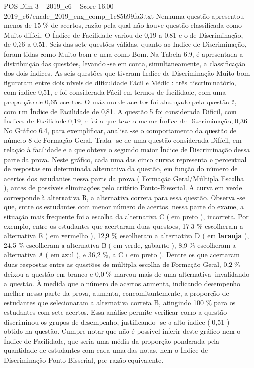 \begin{textsample}{POS Dim 3 – 2019\_c6 – Score 16.00 – 2019\_c6/enade\_2019\_eng\_comp\_1c85b99fa3.txt}
Nenhuma questão apresentou menos de 15 \% de acertos, razão pela qual não houve questão classificada como Muito difícil.
O Índice de Facilidade variou de 0,19 a 0,81 e o de Discriminação, de 0,36 a 0,51.
Seis das sete questões válidas, quanto ao Índice de Discriminação, foram tidas como Muito bom e uma como Bom.
Na Tabela 6.9, é apresentada a distribuição das questões, levando -se em conta, simultaneamente, a classificação dos dois índices.
As seis questões que tiveram Índice de Discriminação Muito bom figuraram entre dois níveis de dificuldade Fácil e Médio : três discriminatório, com índice 0,51, e foi considerada Fácil em termos de facilidade, com uma proporção de 0,65 acertos.
O máximo de acertos foi alcançado pela questão 2, com um Índice de Facilidade de 0,81.
A questão 5 foi considerada Difícil, com Índices de Facilidade 0,19, e foi a que teve o menor Índice de Discriminação, 0,36.
No Gráfico 6.4, para exemplificar, analisa -se o comportamento da questão de número 8 de Formação Geral.
Trata -se de uma questão considerada Difícil, em relação à facilidade e a que obteve o segundo maior Índice de Discriminação dessa parte da prova.
Neste gráfico, cada uma das cinco curvas representa o percentual de respostas em determinada alternativa da questão, em função do número de acertos dos estudantes nessa parte da prova ( Formação Geral/Múltipla Escolha ), antes de possíveis eliminações pelo critério Ponto-Bisserial.
A curva em verde corresponde à alternativa B, a alternativa correta para essa questão.
Observa -se que, entre os estudantes com menor número de acertos, nessa parte do exame, a situação mais frequente foi a escolha da alternativa C ( em preto ), incorreta.
Por exemplo, entre os estudantes que acertaram duas questões, 17,3 \% escolheram a alternativa E ( em vermelho ), 12,9 \% escolheram a alternativa D ( em \textbf{laranja} ), 24,5 \% escolheram a alternativa B ( em verde, gabarito ), 8,9 \% escolheram a alternativa A ( em azul ), e 36,2 \%, a C ( em preto ).
Dentre os que acertaram duas respostas entre as questões de múltipla escolha de Formação Geral, 0,2 \% deixou a questão em branco e 0,0 \% marcou mais de uma alternativa, invalidando a questão.
À medida que o número de acertos aumenta, indicando desempenho melhor nessa parte da prova, aumenta, concomitantemente, a proporção de estudantes que selecionaram a alternativa correta B, atingindo 100 \% para os estudantes com sete acertos.
Essa análise permite verificar como a questão discriminou os grupos de desempenho, justificando -se o alto índice ( 0,51 ) obtido na questão.
Cumpre notar que não é possível inferir deste gráfico nem o Índice de Facilidade, que seria uma média da proporção ponderada pela quantidade de estudantes com cada uma das notas, nem o Índice de Discriminação Ponto-Bisserial, por razão equivalente.

\end{textsample}

